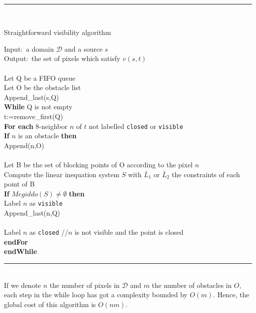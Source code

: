 \documentclass[fleqn,twoside]{article}
\begin{document}
\ \\
{\small \hrule 
\ \\
\centerline{\textsf{Straightforward visibility algorithm}}
{\sf
Input:~a domain $\mathcal{D}$ and a source $s$\\
Output:~the set of pixels which satisfy $v(s,t)$\\
\ \\
Let Q be a FIFO queue\\
Let O be the obstacle list\\
Append\_last(s,Q)\\
{\bf While} Q is not empty\\
\hspace*{0.5cm} t:=remove\_first(Q)\\
\hspace*{0.5cm} {\bf For each} 8-neighbor $n$ of $t$ not labelled {\tt closed} or {\tt visible}\\
\hspace*{1cm} {\bf If} $n$ is an obstacle {\bf then}\\
\hspace*{1.5cm} Append(n,O)\\
\hspace*{1cm}{\bf else}\\
\hspace*{1.5cm} Let B be the set of blocking points of O according to the pixel $n$\\
\hspace*{1.5cm} Compute the linear inequation system $S$ with $\bar{L}_1$ or $\bar{L}_2$ the
constraints of each point of B\\
\hspace*{1.5cm} {\bf If} $Megiddo(S)\neq\emptyset$ {\bf then }\\
\hspace*{2cm} Label $n$ as {\tt visible}\\
\hspace*{2cm} Append\_last(n,Q)\\
\hspace*{1.5cm}{\bf else}\\
\hspace*{2cm} Label $n$ as {\tt closed} //$n$ is not visible and the point is closed\\
\hspace*{0.5cm} {\bf endFor}\\
{\bf endWhile}\\
}
\hrule}\ \\

If  we denote $n$ the  number of pixels  in  $\mathcal{D}$ and $m$ the
number  of obstacles in $O$,  each  step in the  while  loop has got a
complexity bounded by $O(m)$. Hence, the global cost of this algorithm
is $O(nm)$.
\end{document}
